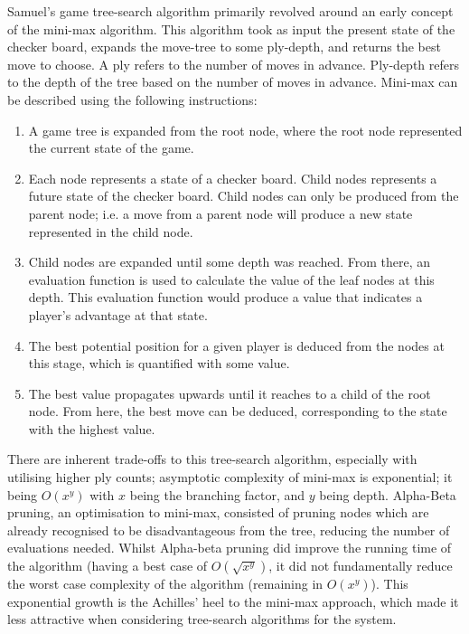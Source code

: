 \documentclass[12pt,a4paper]{article}
\begin{document}
        
        Samuel's game tree-search algorithm primarily revolved around an early concept of the mini-max algorithm. This algorithm took as input the present state of the checker board, expands the move-tree to some ply-depth, and returns the best move to choose. A ply refers to the number of moves in advance. Ply-depth refers to the depth of the tree based on the number of moves in advance. Mini-max can be described using the following instructions:
        
        \begin{enumerate}
            \item A game tree is expanded from the root node, where the root node represented the current state of the game.
            \item Each node represents a state of a checker board. Child nodes represents a future state of the checker board. Child nodes can only be produced from the parent node; i.e. a move from a parent node will produce a new state represented in the child node.
            \item Child nodes are expanded until some depth was reached. From there, an evaluation function is used to calculate the value of the leaf nodes at this depth. This evaluation function would produce a value that indicates a player's advantage at that state.
            \item The best potential position for a given player is deduced from the nodes at this stage, which is quantified with some value.
            \item The best value propagates upwards until it reaches to a child of the root node. From here, the best move can be deduced, corresponding to the state with the highest value.
        \end{enumerate}

        There are inherent trade-offs to this tree-search algorithm, especially with utilising higher ply counts; asymptotic complexity of mini-max is exponential; it being $O(x^y)$ with $x$ being the branching factor, and $y$ being depth. Alpha-Beta pruning, an optimisation to mini-max, consisted of pruning nodes which are already recognised to be disadvantageous from the tree, reducing the number of evaluations needed. Whilst Alpha-beta pruning did improve the running time of the algorithm (having a best case of $O(\sqrt{x^y})$, it did not fundamentally reduce the worst case complexity of the algorithm (remaining in $O(x^y)$). This exponential growth is the Achilles' heel to the mini-max approach, which made it less attractive when considering tree-search algorithms for the system.
\end{document}
